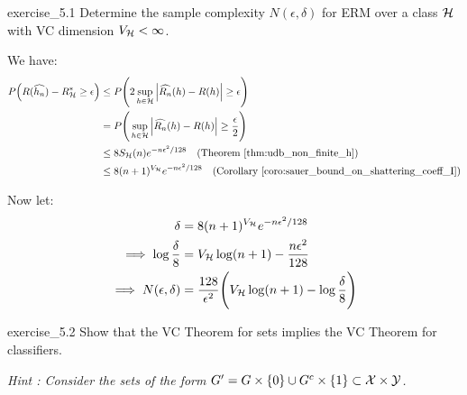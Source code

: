 \begin{exercise}{}{exercise_5.1}
    Determine the sample complexity $N(\epsilon, \delta)$ for ERM over a class $\mathcal{H}$ with VC dimension $V_{\mathcal{H}}<\infty$.
\end{exercise}

\begin{solution*}
    We have:
    \begin{align*}
        P\bigRound{R(\widehat{h_n}) - R_\Hf^* \ge \epsilon} 
        &\le P\biggRound{
            2\sup_{h\in\Hf}\bigAbs{ \widehat{R_n}(h) - R(h) } \ge \epsilon
        } \\
        &= P\biggRound{
            \sup_{h\in\Hf}\bigAbs{ \widehat{R_n}(h) - R(h) } \ge \frac{\epsilon}{2}
        } \\
        &\le 8S_\Hf(n)e^{-n\epsilon^2/128} \ \ \ (\text{Theorem } \ref{thm:udb_non_finite_h}) \\
        &\le 8(n+1)^{V_\Hf} e^{-n\epsilon^2/128} \ \ \ (\text{Corollary } \ref{coro:sauer_bound_on_shattering_coeff_I})
    \end{align*}

    \noindent Now let:
    \begin{align*}
        \delta &= 8(n+1)^{V_{\mathcal{H}}}e^{-n\epsilon^2/128} \\
        \implies
        \log\frac{\delta}{8} &= V_{\mathcal{H}}\log(n+1) - \frac{n\epsilon^2}{128}
        \\
        \implies
        N(\epsilon, \delta) &= \frac{128}{\epsilon^2} \Bigg( 
            V_{\mathcal{H}}\log (n+1) - \log\frac{\delta}{8}
         \Bigg)
    \end{align*}
\end{solution*}

\begin{exercise}{}{exercise_5.2}
    Show that the VC Theorem for sets implies the VC Theorem for classifiers. 

    \noindent\newline\textit{Hint : Consider the sets of the form $G'=G\times\{0\} \cup G^c \times \{1\} \subset \mathcal{X}\times\mathcal{Y}$.}
\end{exercise}

